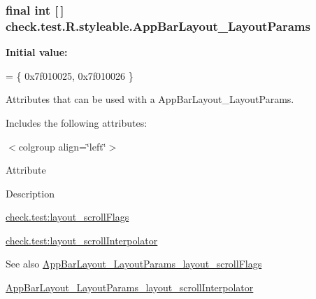 \subsubsection[{App\+Bar\+Layout\+\_\+\+Layout\+Params}]{\setlength{\rightskip}{0pt plus 5cm}final int \mbox{[}$\,$\mbox{]} check.\+test.\+R.\+styleable.\+App\+Bar\+Layout\+\_\+\+Layout\+Params\hspace{0.3cm}{\ttfamily [static]}}\label{classcheck_1_1test_1_1_r_1_1styleable_adbe27e505a2c53030b9f1cc91b81a452}
{\bfseries Initial value\+:}
\begin{DoxyCode}
= \{
            0x7f010025, 0x7f010026
        \}
\end{DoxyCode}
Attributes that can be used with a App\+Bar\+Layout\+\_\+\+Layout\+Params. 

Includes the following attributes\+:

\begin{TabularC}{0}
\hline
\end{TabularC}
$<$colgroup align=\char`\"{}left\char`\"{}$>$ 

Attribute

Description 

{\ttfamily \hyperlink{classcheck_1_1test_1_1_r_1_1styleable_a9b9cef87b7b8a51d20c37c2a13fb320a}{check.\+test\+:layout\+\_\+scroll\+Flags}}

{\ttfamily \hyperlink{classcheck_1_1test_1_1_r_1_1styleable_a8466df23f54f293c6b7257f630ad0862}{check.\+test\+:layout\+\_\+scroll\+Interpolator}}

\begin{DoxySeeAlso}{See also}
\hyperlink{classcheck_1_1test_1_1_r_1_1styleable_a9b9cef87b7b8a51d20c37c2a13fb320a}{App\+Bar\+Layout\+\_\+\+Layout\+Params\+\_\+layout\+\_\+scroll\+Flags} 

\hyperlink{classcheck_1_1test_1_1_r_1_1styleable_a8466df23f54f293c6b7257f630ad0862}{App\+Bar\+Layout\+\_\+\+Layout\+Params\+\_\+layout\+\_\+scroll\+Interpolator} 
\end{DoxySeeAlso}
\hypertarget{classcheck_1_1test_1_1_r_1_1styleable_a9b9cef87b7b8a51d20c37c2a13fb320a}{}
